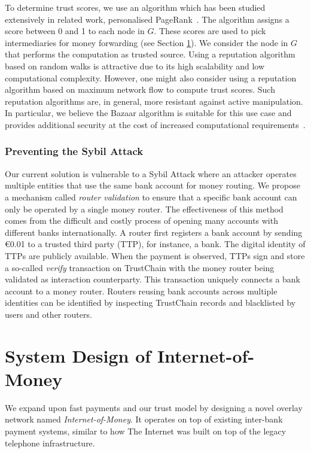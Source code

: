 To determine trust scores, we use an algorithm which has been studied extensively in related work, personalised PageRank~\cite{page1999pagerank}. %
The algorithm assigns a score between 0 and 1 to each node in $ G $.
These scores are used to pick intermediaries for money forwarding (see Section \ref{sec:system_design}).
We consider the node in $ G $ that performs the computation as trusted source.
Using a reputation algorithm based on random walks is attractive due to its high scalability and low computational complexity.
However, one might also consider using a reputation algorithm based on maximum network flow to compute trust scores.
Such reputation algorithms are, in general, more resistant against active manipulation.
In particular, we believe the Bazaar algorithm is suitable for this use case and provides additional security at the cost of increased computational requirements~\cite{post2011bazaar}.

\subsubsection*{Preventing the Sybil Attack}
Our current solution is vulnerable to a Sybil Attack where an attacker operates multiple entities that use the same bank account for money routing.
We propose a mechanism called \emph{router validation} to ensure that a specific bank account can only be operated by a single money router.
The effectiveness of this method comes from the difficult and costly process of opening many accounts with different banks internationally. %
A router first registers a bank account by sending \euro 0.01 to a trusted third party (TTP), for instance, a bank.
The digital identity of TTPs are publicly available.
When the payment is observed, TTPs sign and store a so-called \emph{verify} transaction on TrustChain with the money router being validated as interaction counterparty.
This transaction uniquely connects a bank account to a money router.
Routers reusing bank accounts across multiple identities can be identified by inspecting TrustChain records and blacklisted by users and other routers.

\section{System Design of Internet-of-Money}
\label{sec:system_design}
We expand upon fast payments and our trust model by designing a novel overlay network named \emph{Internet-of-Money}.
It operates on top of existing inter-bank payment systems, similar to how The Internet was built on top of the legacy telephone infrastructure.

